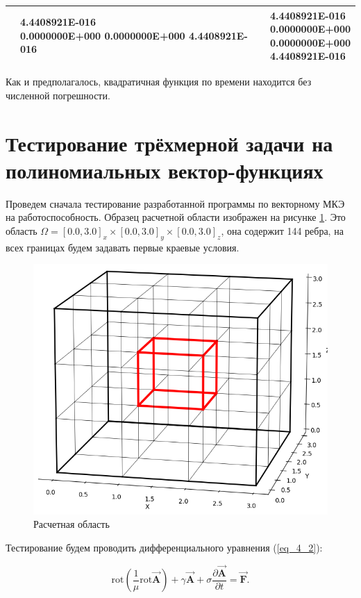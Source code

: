 \begin{table}
\begin{tabularx}{1.0\textwidth}{| >{\raggedright\arraybackslash}X | >{\raggedright\arraybackslash}X |>{\raggedright\arraybackslash}X |}
		\centering{1.0} & \centering{4.4408921E-016 \\
			0.0000000E+000
			0.0000000E+000
			4.4408921E-016} & \centering{4.4408921E-016 \\
			0.0000000E+000 \\
			0.0000000E+000 \\
			4.4408921E-016} \tabularnewline \hline
		
	\end{tabularx}
	\label{tab:test2D12}
\end{table}

Как и предполагалось, квадратичная функция по времени находится без численной погрешности.

\section{Тестирование трёхмерной задачи на полиномиальных вектор-функциях}

Проведем сначала тестирование разработанной программы по векторному МКЭ на работоспособность. Образец расчетной области изображен на рисунке \ref{fig:exampleOfArea}. Это область $\Omega = [0.0, 3.0]_x \times [0.0, 3.0]_y \times [0.0, 3.0]_z$, она содержит 144 ребра, на всех границах будем задавать первые краевые условия. 

\begin{figure}
	\centering
	\vspace*{0.7cm}
	\includegraphics[width=0.7\linewidth]{images/3D_grid_example.png}
	\caption{Расчетная область}
	\label{fig:exampleOfArea}
\end{figure}

Тестирование будем проводить дифференциального уравнения (\ref{eq_4_2}):

\begin{equation} \label{eq_4_2}
	\text{rot} \left(\frac{1}{\mu} \text{rot} \overrightarrow{\textbf{A}}\right) + \gamma \overrightarrow{\textbf{A}} + \sigma \frac{\partial \overrightarrow{\textbf{A}}}{\partial t} = \overrightarrow{\textbf{F}}.
\end{equation}

